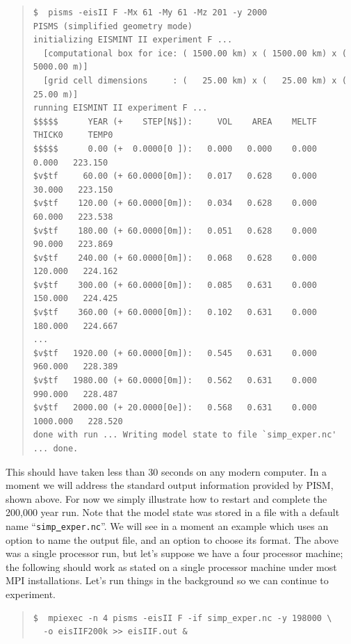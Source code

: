 \documentclass[11pt,final]{amsart}
\begin{document}
\small\begin{quote}\begin{verbatim}
$  pisms -eisII F -Mx 61 -My 61 -Mz 201 -y 2000
PISMS (simplified geometry mode)
initializing EISMINT II experiment F ...
  [computational box for ice: ( 1500.00 km) x ( 1500.00 km) x ( 5000.00 m)]
  [grid cell dimensions     : (   25.00 km) x (   25.00 km) x (   25.00 m)]
running EISMINT II experiment F ...
$$$$$      YEAR (+    STEP[N$]):     VOL    AREA    MELTF     THICK0     TEMP0
$$$$$      0.00 (+  0.0000[0 ]):   0.000   0.000    0.000      0.000   223.150
$v$tf     60.00 (+ 60.0000[0m]):   0.017   0.628    0.000     30.000   223.150
$v$tf    120.00 (+ 60.0000[0m]):   0.034   0.628    0.000     60.000   223.538
$v$tf    180.00 (+ 60.0000[0m]):   0.051   0.628    0.000     90.000   223.869
$v$tf    240.00 (+ 60.0000[0m]):   0.068   0.628    0.000    120.000   224.162
$v$tf    300.00 (+ 60.0000[0m]):   0.085   0.631    0.000    150.000   224.425
$v$tf    360.00 (+ 60.0000[0m]):   0.102   0.631    0.000    180.000   224.667
...
$v$tf   1920.00 (+ 60.0000[0m]):   0.545   0.631    0.000    960.000   228.389
$v$tf   1980.00 (+ 60.0000[0m]):   0.562   0.631    0.000    990.000   228.487
$v$tf   2000.00 (+ 20.0000[0e]):   0.568   0.631    0.000   1000.000   228.520
done with run ... Writing model state to file `simp_exper.nc' ... done.
\end{verbatim}
\end{quote}\normalsize

This should have taken less than 30 seconds on any modern computer.  In a moment we will address the standard output information provided by PISM, shown above.  For now we simply illustrate how to restart and complete the 200,000 year run.  Note that the model state was stored in a file with a default name ``\texttt{simp\underline{ }exper.nc}''.  We will see in a moment an example which uses an option to name the output file, and an option to choose its format.  The above was a single processor run, but let's suppose we have a four processor machine; the following should work as stated on a single processor machine under most MPI installations.  Let's run things in the background so we can continue to experiment.

\small\begin{quote}\begin{verbatim}
$  mpiexec -n 4 pisms -eisII F -if simp_exper.nc -y 198000 \
  -o eisIIF200k >> eisIIF.out &
\end{verbatim}
\end{quote}\normalsize
\end{document}
